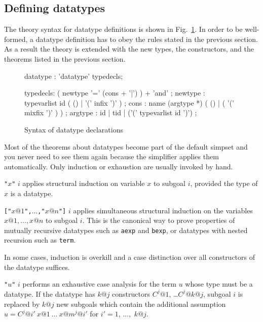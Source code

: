 \subsection{Defining datatypes}

The theory syntax for datatype definitions is shown in
Fig.~\ref{datatype-grammar}.  In order to be well-formed, a datatype
definition has to obey the rules stated in the previous section.  As a result
the theory is extended with the new types, the constructors, and the theorems
listed in the previous section.

\begin{figure}
\begin{rail}
datatype : 'datatype' typedecls;

typedecls: ( newtype '=' (cons + '|') ) + 'and'
         ;
newtype  : typevarlist id ( () | '(' infix ')' )
         ;
cons     : name (argtype *) ( () | ( '(' mixfix ')' ) )
         ;
argtype  : id | tid | ('(' typevarlist id ')')
         ;
\end{rail}
\caption{Syntax of datatype declarations}
\label{datatype-grammar}
\end{figure}

Most of the theorems about datatypes become part of the default simpset and
you never need to see them again because the simplifier applies them
automatically.  Only induction or exhaustion are usually invoked by hand.
\begin{ttdescription}
\item[\ttindexbold{induct_tac} {\tt"}$x${\tt"} $i$]
 applies structural induction on variable $x$ to subgoal $i$, provided the
 type of $x$ is a datatype.
\item[\ttindexbold{mutual_induct_tac}
  {\tt["}$x@1${\tt",}$\ldots${\tt,"}$x@n${\tt"]} $i$] applies simultaneous
  structural induction on the variables $x@1,\ldots,x@n$ to subgoal $i$.  This
  is the canonical way to prove properties of mutually recursive datatypes
  such as \texttt{aexp} and \texttt{bexp}, or datatypes with nested recursion such as
  \texttt{term}.
\end{ttdescription}
In some cases, induction is overkill and a case distinction over all
constructors of the datatype suffices.
\begin{ttdescription}
\item[\ttindexbold{exhaust_tac} {\tt"}$u${\tt"} $i$]
 performs an exhaustive case analysis for the term $u$ whose type
 must be a datatype.  If the datatype has $k@j$ constructors
 $C^j@1$, \dots $C^j@{k@j}$, subgoal $i$ is replaced by $k@j$ new subgoals which
 contain the additional assumption $u = C^j@{i'}~x@1~\dots~x@{m^j@{i'}}$ for
 $i'=1$, $\dots$,~$k@j$.
\end{ttdescription}

